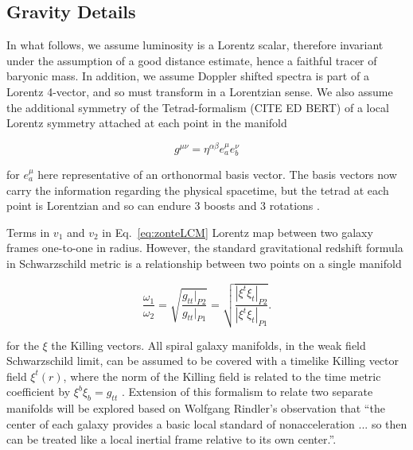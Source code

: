 \documentclass[reprint,%
 amsmath,amssymb,
 aps,
]{revtex4-1}
\begin{document}
  
 
\subsection{Gravity Details \label{sec:gravDets}}

 In what follows, we    assume  luminosity   is a Lorentz scalar, therefore invariant under the assumption of a good distance estimate, hence a faithful tracer of baryonic mass. 
   In addition, we assume   
   Doppler shifted spectra is part of a Lorentz 4-vector, and so    must transform in a Lorentzian sense. 
   We   also assume   the additional symmetry of the  Tetrad-formalism (CITE ED BERT)   of a local Lorentz symmetry attached at each point in the manifold 


\begin{equation}
    g^{\mu \nu} = \eta^{\alpha \beta} e^\mu_a  e^\nu_b
\end{equation} 

for $e^\mu_a$ here representative of an orthonormal basis vector. The basis vectors now carry the information regarding the physical spacetime, but the tetrad at each point is Lorentzian and so can endure 3 boosts and 3 rotations \cite{BertschingerClassTetrads}.  
   
   
   Terms in $v_1$ and   $v_2$ in Eq.~\ref{eq:zonteLCM}   Lorentz map between two galaxy frames one-to-one in radius. However, the standard gravitational redshift formula in Schwarzschild metric is a relationship between two points on a single manifold
  
   
   \begin{equation}
       \frac{\omega_1}{\omega_2}  =\sqrt{\frac{g_{tt}|_{P2}}{g_{tt}|_{P1}}} =\sqrt{\frac{|\xi^t\xi_{t}|_{P2}}{|\xi^t\xi_{t}|_{P1}}}. 
      \label{eq:grav}
    \end{equation} 
     
     for the $\xi$ the Killing vectors.  All spiral galaxy manifolds,  in the weak field Schwarzschild limit, can be     assumed to be covered with a timelike   Killing vector field 
   $\xi^t(r)$, where the norm of the Killing field is related to the time metric coefficient  by  $\xi^b \xi_b =g_{tt}$ \cite{Wald}.  Extension of this formalism to relate two separate manifolds will be explored  based on Wolfgang Rindler's   observation  that    ``the center of each galaxy provides a basic local standard of nonacceleration ... so then can be treated like a local inertial frame relative to its own center.''\cite{rindler2013essential}.
  
\end{document}
